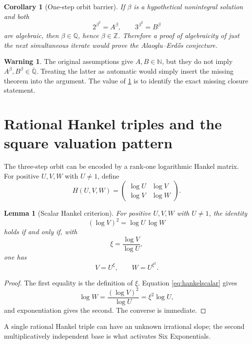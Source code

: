 \documentclass[11pt]{article}
\numberwithin{equation}{section}
\newtheorem{lemma}[theorem]{Lemma}
\newtheorem{corollary}[theorem]{Corollary}
\theoremstyle{definition}
\newtheorem{warning}[theorem]{Warning}
\newcommand{\Q}{\mathbb{Q}}
\newcommand{\Z}{\mathbb{Z}}
\newcommand{\N}{\mathbb{N}}
\newcommand{\Qbar}{\overline{\mathbb{Q}}}
\begin{document}
\begin{corollary}[One-step orbit barrier]\label{cor:onestepbarrier}
If \(\beta\) is a hypothetical nonintegral solution and both
\[
       2^{\beta^2}=A^\beta,
       \qquad
       3^{\beta^2}=B^\beta
\]
are algebraic, then \(\beta\in\Q\), hence \(\beta\in\Z\). Therefore a proof of algebraicity of just the next simultaneous iterate would prove the Alaoglu--Erd\H{o}s conjecture.
\end{corollary}

\begin{warning}
The original assumptions give \(A,B\in\N\), but they do not imply \(A^\beta,B^\beta\in\Qbar\). Treating the latter as automatic would simply insert the missing theorem into the argument. The value of \cref{cor:onestepbarrier} is to identify the exact missing closure statement.
\end{warning}

\section{Rational Hankel triples and the square valuation pattern}

The three-step orbit can be encoded by a rank-one logarithmic Hankel matrix. For positive \(U,V,W\) with \(U\ne1\), define
\[
      H(U,V,W)=
      \begin{pmatrix}
       \log U&\log V\\
       \log V&\log W
      \end{pmatrix}.
\]

\begin{lemma}[Scalar Hankel criterion]\label{lem:hankelscalar}
For positive \(U,V,W\) with \(U\ne1\), the identity
\begin{equation}\label{eq:hankelscalar}
       (\log V)^2=\log U\,\log W
\end{equation}
holds if and only if, with
\[
       \xi=\frac{\log V}{\log U},
\]
one has
\[
       V=U^\xi,
       \qquad
       W=U^{\xi^2}.
\]
\end{lemma}

\begin{proof}
The first equality is the definition of \(\xi\). Equation \eqref{eq:hankelscalar} gives
\[
       \log W=\frac{(\log V)^2}{\log U}=\xi^2\log U,
\]
and exponentiation gives the second. The converse is immediate.
\end{proof}

A single rational Hankel triple can have an unknown irrational slope; the second multiplicatively independent base is what activates Six Exponentials.
\end{document}
